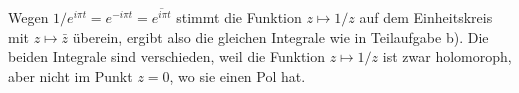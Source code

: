 \begin{loesung}
\begin{teilaufgaben}
Wegen $1/e^{i\pi t}=e^{-i\pi t}=\overline{e^{i\pi t}}$ stimmt
die Funktion $z\mapsto 1/z$ auf dem Einheitskreis mit $z\mapsto\bar{z}$ 
überein, ergibt also die gleichen Integrale wie in Teilaufgabe b).
Die beiden Integrale sind verschieden, weil die Funktion $z\mapsto1/z$
ist zwar holomoroph, aber nicht im Punkt $z=0$, wo sie einen Pol hat.
\qedhere
\end{teilaufgaben}
\end{loesung}
